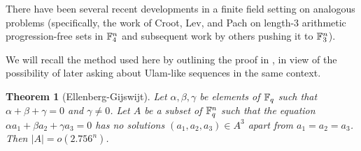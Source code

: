 \documentclass{report}
\newtheorem{theorem}{Theorem}[section]
\theoremstyle{remark}
\numberwithin{equation}{section}
\begin{document}
There have been several recent developments in a finite field setting
on analogous problems (specifically, the work of Croot, Lev, and Pach
\cite{croot:preprint} on length-3 arithmetic progression-free sets in
$\mathbb{F}_4^n$ and subsequent work by others \cite{ellenberg:preprint}
pushing it to $\mathbb{F}_3^n$).

We will recall the method used here by outlining the proof in
\cite{ellenberg:preprint}, in view of the possibility of later asking
about Ulam-like sequences in the same context.

\begin{theorem}[Ellenberg-Gijswijt]
Let $\alpha, \beta, \gamma$ be elements of $\mathbb{F}_q$ such that
$\alpha+\beta+\gamma = 0$ and $\gamma \neq 0$.  Let $A$ be a subset of
$\mathbb{F}_q^n$ such that the equation $\alpha a_1 + \beta a_2 + \gamma a_3
= 0$ has no solutions $(a_1, a_2, a_3) \in A^3$ apart from $a_1 = a_2
= a_3$.  Then $|A| = o(2.756^n)$.
\end{theorem}
\end{document}
